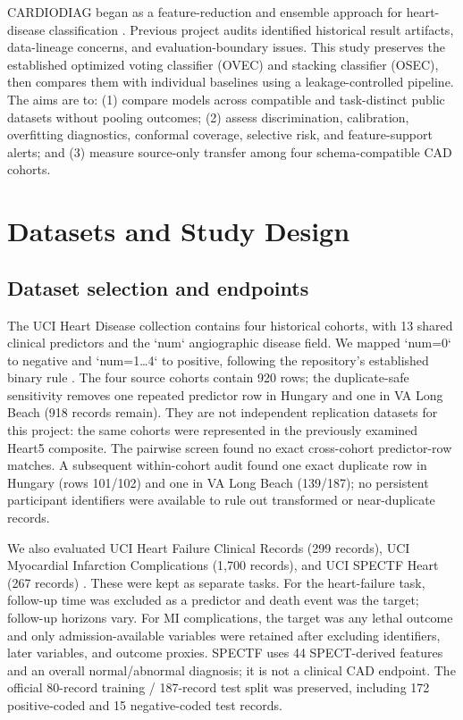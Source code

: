 \documentclass[conference]{IEEEtran}
\begin{document}
CARDIODIAG began as a feature-reduction and ensemble approach for heart-disease classification \cite{khan2026cardiodiag}. Previous project audits identified historical result artifacts, data-lineage concerns, and evaluation-boundary issues. This study preserves the established optimized voting classifier (OVEC) and stacking classifier (OSEC), then compares them with individual baselines using a leakage-controlled pipeline. The aims are to: (1) compare models across compatible and task-distinct public datasets without pooling outcomes; (2) assess discrimination, calibration, overfitting diagnostics, conformal coverage, selective risk, and feature-support alerts; and (3) measure source-only transfer among four schema-compatible CAD cohorts.

\section{Datasets and Study Design}
\subsection{Dataset selection and endpoints}
The UCI Heart Disease collection contains four historical cohorts, with 13 shared clinical predictors and the `num` angiographic disease field. We mapped `num=0` to negative and `num=1\ldots4` to positive, following the repository’s established binary rule \cite{ucihd}. The four source cohorts contain 920 rows; the duplicate-safe sensitivity removes one repeated predictor row in Hungary and one in VA Long Beach (918 records remain). They are not independent replication datasets for this project: the same cohorts were represented in the previously examined Heart5 composite. The pairwise screen found no exact cross-cohort predictor-row matches. A subsequent within-cohort audit found one exact duplicate row in Hungary (rows 101/102) and one in VA Long Beach (139/187); no persistent participant identifiers were available to rule out transformed or near-duplicate records.

We also evaluated UCI Heart Failure Clinical Records (299 records), UCI Myocardial Infarction Complications (1,700 records), and UCI SPECTF Heart (267 records) \cite{ucihf519,ucimi579,ucispectf}. These were kept as separate tasks. For the heart-failure task, follow-up time was excluded as a predictor and death event was the target; follow-up horizons vary. For MI complications, the target was any lethal outcome and only admission-available variables were retained after excluding identifiers, later variables, and outcome proxies. SPECTF uses 44 SPECT-derived features and an overall normal/abnormal diagnosis; it is not a clinical CAD endpoint. The official 80-record training / 187-record test split was preserved, including 172 positive-coded and 15 negative-coded test records.
\end{document}
